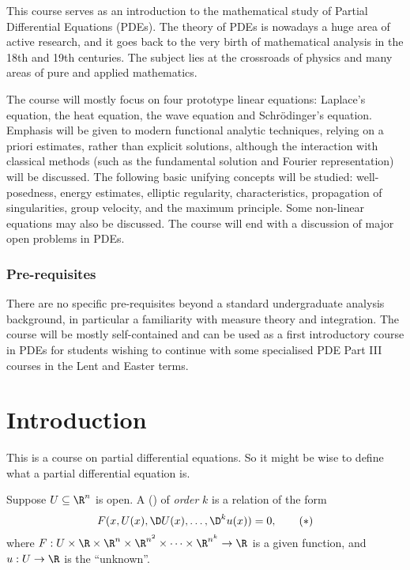 \documentclass[a4paper]{article}
\begin{document}
\maketitle
{\small
\setlength{\parindent}{0em}
\setlength{\parskip}{1em}

This course serves as an introduction to the mathematical study of Partial Differential Equations (PDEs). The theory of PDEs is nowadays a huge area of active research, and it goes back to the very birth of mathematical analysis in the 18th and 19th centuries. The subject lies at the crossroads of physics and many areas of pure and applied mathematics.

The course will mostly focus on four prototype linear equations: Laplace's equation, the heat equation, the wave equation and Schr\"odinger's equation. Emphasis will be given to modern functional analytic techniques, relying on a priori estimates, rather than explicit solutions, although the interaction with classical methods (such as the fundamental solution and Fourier representation) will be discussed. The following basic unifying concepts will be studied: well-posedness, energy estimates, elliptic regularity, characteristics, propagation of singularities, group velocity, and the maximum principle. Some non-linear equations may also be discussed. The course will end with a discussion of major open problems in PDEs.

\subsubsection*{Pre-requisites}
There are no specific pre-requisites beyond a standard undergraduate analysis background, in particular a familiarity with measure theory and integration. The course will be mostly self-contained and can be used as a first introductory course in PDEs for students wishing to continue with some specialised PDE Part III courses in the Lent and Easter terms.
}
\tableofcontents

\section{Introduction}
This is a course on partial differential equations. So it might be wise to define what a partial differential equation is.

\begin{defi}
  Suppose $U \subseteq \R^n$ is open. A  () of \emph{order} $k$ is a relation of the form
  \[
    F(x, U(x), \D U(x), \ldots, \D^k u(x)) = 0,\tag{$*$}
  \]
  where $F: U \times \R \times \R^n \times \R^{n^2} \times \cdots \times \R^{n^k} \to \R$ is a given function, and $u: U \to \R$ is the ``unknown''.
\end{defi}
\end{document}
